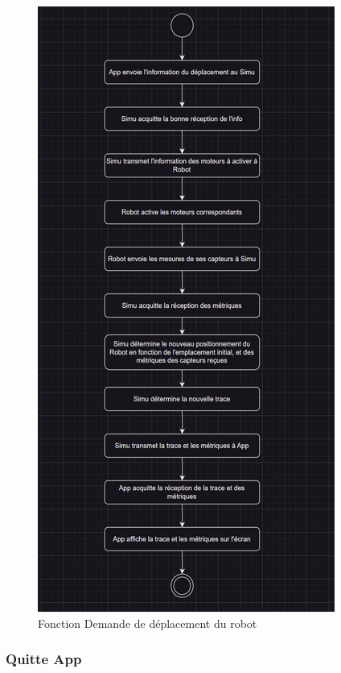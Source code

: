 \begin{figure}[H]
    \centering
    \includegraphics[scale=0.5]{data/function2.png}
    \caption{Fonction Demande de déplacement du robot}
    \label{fig:ihm_move}
\end{figure}

\subsubsection{Quitte App}

